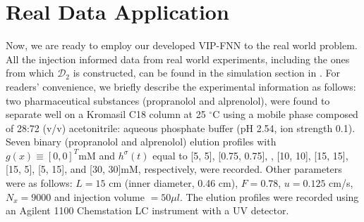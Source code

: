 \documentclass[thmsa,onecolumn,12pt]{article}%
\begin{document}
\section{Real Data Application}
\label{Realdata}

Now, we are ready to employ our developed VIP-FNN to the real world problem. All the injection informed data from real world experiments, including the ones from which $\mathcal{D}_2$ is constructed, can be found in the simulation section in \cite{zhang2016regularization}. For readers' convenience, we briefly describe the experimental information as follows: two pharmaceutical substances (propranolol and alprenolol), were found to separate well on a Kromasil C18 column at 25 $^{\circ}$C using a mobile phase composed of 28:72 (v/v) acetonitrile: aqueous phosphate buffer (pH 2.54, ion strength 0.1). Seven binary (propranolol and alprenolol) elution profiles with $g(x)\equiv [0, 0]^T \textrm{mM}$ and $h^\sigma(t)$ equal to [5, 5], [0.75, 0.75], , [10, 10], [15, 15], [15, 5], [5, 15], and [30, 30]mM, respectively, were recorded. Other parameters were as follows: $L=15$ cm (inner diameter, 0.46 cm), $F = 0.78$, $u = 0.125$ cm/s, $N_x = 9000$ and injection volume $= 50\mu l$. The elution profiles were recorded using an Agilent 1100 Chemstation LC instrument with a UV detector.
\end{document}
